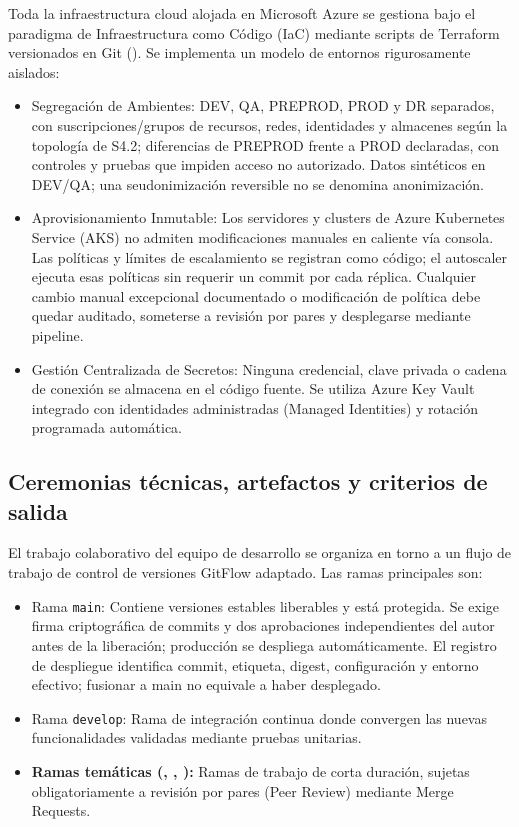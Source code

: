 Toda la infraestructura cloud alojada en Microsoft Azure se gestiona bajo el paradigma de Infraestructura como Código (IaC) mediante scripts de Terraform versionados en Git (). Se implementa un modelo de entornos rigurosamente aislados:

\begin{itemize}
\item Segregación de Ambientes: DEV, QA, PREPROD, PROD y DR separados, con suscripciones/grupos de recursos, redes, identidades y almacenes según la topología de S4.2; diferencias de PREPROD frente a PROD declaradas, con controles y pruebas que impiden acceso no autorizado. Datos sintéticos en DEV/QA; una seudonimización reversible no se denomina anonimización.
\item Aprovisionamiento Inmutable: Los servidores y clusters de Azure Kubernetes Service (AKS) no admiten modificaciones manuales en caliente vía consola. Las políticas y límites de escalamiento se registran como código; el autoscaler ejecuta esas políticas sin requerir un commit por cada réplica. Cualquier cambio manual excepcional documentado o modificación de política debe quedar auditado, someterse a revisión por pares y desplegarse mediante pipeline.
\item Gestión Centralizada de Secretos: Ninguna credencial, clave privada o cadena de conexión se almacena en el código fuente. Se utiliza Azure Key Vault integrado con identidades administradas (Managed Identities) y rotación programada automática.
\end{itemize}

\FloatBarrier
\subsection{Ceremonias técnicas, artefactos y criterios de salida}\label{sec:6-desarrollo-ceremonias}\label{sec:06-ceremonias-tecnicas-artefactos-y-criterios-de-salida}

El trabajo colaborativo del equipo de desarrollo se organiza en torno a un flujo de trabajo de control de versiones GitFlow adaptado. Las ramas principales son:

\begin{itemize}
\item Rama \texttt{main}: Contiene versiones estables liberables y está protegida. Se exige firma criptográfica de commits y dos aprobaciones independientes del autor antes de la liberación; producción se despliega automáticamente. El registro de despliegue identifica commit, etiqueta, digest, configuración y entorno efectivo; fusionar a main no equivale a haber desplegado.
\item Rama \texttt{develop}: Rama de integración continua donde convergen las nuevas funcionalidades validadas mediante pruebas unitarias.
\item \textbf{Ramas temáticas (\parencite{iso42010}, \parencite{iso25012}, \parencite{iso31000}):} Ramas de trabajo de corta duración, sujetas obligatoriamente a revisión por pares (Peer Review) mediante Merge Requests.
\end{itemize}

